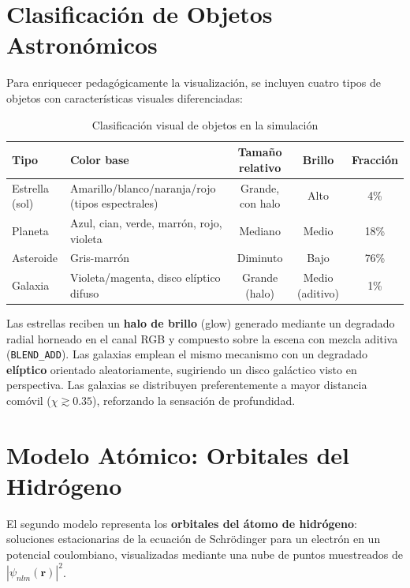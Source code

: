 \documentclass[12pt, a4paper]{article}
\begin{document}
\section{Clasificación de Objetos Astronómicos}

Para enriquecer pedagógicamente la visualización, se incluyen cuatro
tipos de objetos con características visuales diferenciadas:

\begin{table}[H]
  \centering
  \caption{Clasificación visual de objetos en la simulación}
  \begin{tabular}{llccc}
    \toprule
    Tipo & Color base & Tamaño relativo & Brillo & Fracción \\
    \midrule
    Estrella (sol) & Amarillo/blanco/naranja/rojo (tipos espectrales) & Grande, con halo & Alto & 4\% \\
    Planeta    & Azul, cian, verde, marrón, rojo, violeta & Mediano & Medio  & 18\% \\
    Asteroide  & Gris-marrón      & Diminuto & Bajo   & 76\% \\
    Galaxia    & Violeta/magenta, disco elíptico difuso & Grande (halo) & Medio (aditivo) & 1\% \\
    \bottomrule
  \end{tabular}
  \label{tab:objetos}
\end{table}

Las estrellas reciben un \textbf{halo de brillo} (glow) generado
mediante un degradado radial horneado en el canal RGB y compuesto
sobre la escena con mezcla aditiva (\texttt{BLEND\_ADD}). Las galaxias
emplean el mismo mecanismo con un degradado \textbf{elíptico} orientado
aleatoriamente, sugiriendo un disco galáctico visto en perspectiva.
Las galaxias se distribuyen preferentemente a mayor distancia comóvil
($\chi \gtrsim 0.35$), reforzando la sensación de profundidad.

\section{Modelo Atómico: Orbitales del Hidrógeno}
\label{sec:atomico}

El segundo modelo representa los \textbf{orbitales del átomo de
hidrógeno}: soluciones estacionarias de la ecuación de Schrödinger
para un electrón en un potencial coulombiano, visualizadas mediante
una nube de puntos muestreados de $|\psi_{nlm}(\mathbf r)|^2$.
\end{document}
